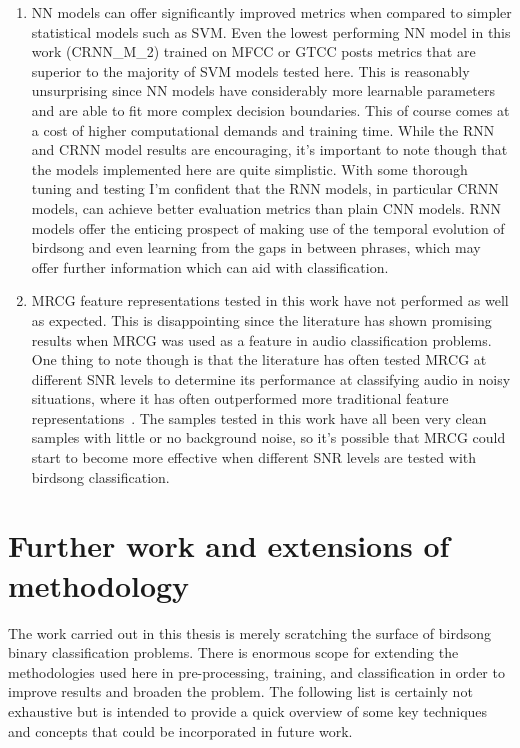 \begin{enumerate}
  \item NN models can offer significantly improved metrics when compared to
    simpler statistical models such as SVM\@. Even the lowest performing NN
    model in this work (CRNN\_M\_2) trained on MFCC or GTCC posts metrics that
    are superior to the majority of SVM models tested here. This is reasonably
    unsurprising since NN models have considerably more learnable parameters and
    are able to fit more complex decision boundaries. This of course comes at a
    cost of higher computational demands and training time. While the RNN and
    CRNN model results are encouraging, it's important to note though that the
    models implemented here are quite simplistic. With some thorough tuning and
    testing I'm confident that the RNN models, in particular CRNN models, can
    achieve better evaluation metrics than plain CNN models. RNN models offer
    the enticing prospect of making use of the temporal evolution of birdsong
    and even learning from the gaps in between phrases, which may offer further
    information which can aid with classification.

  \item MRCG feature representations tested in this work have not performed as
    well as expected. This is disappointing since the literature has shown
    promising results when MRCG was used as a feature in audio classification
    problems. One thing to note though is that the literature has often tested
    MRCG at different SNR levels to determine its performance at classifying
    audio in noisy situations, where it has often outperformed more traditional
    feature representations~\cite{binti2020comparison,chen2014feature}. The
    samples tested in this work have all been very clean samples with little or
    no background noise, so it's possible that MRCG could start to become more
    effective when different SNR levels are tested with birdsong
    classification.

\end{enumerate}

\section{Further work and extensions of methodology}

The work carried out in this thesis is merely scratching the surface of birdsong
binary classification problems. There is enormous scope for extending the
methodologies used here in pre-processing, training, and classification in order
to improve results and broaden the problem. The following list is certainly not
exhaustive but is intended to provide a quick overview of some key techniques
and concepts that could be incorporated in future work.


